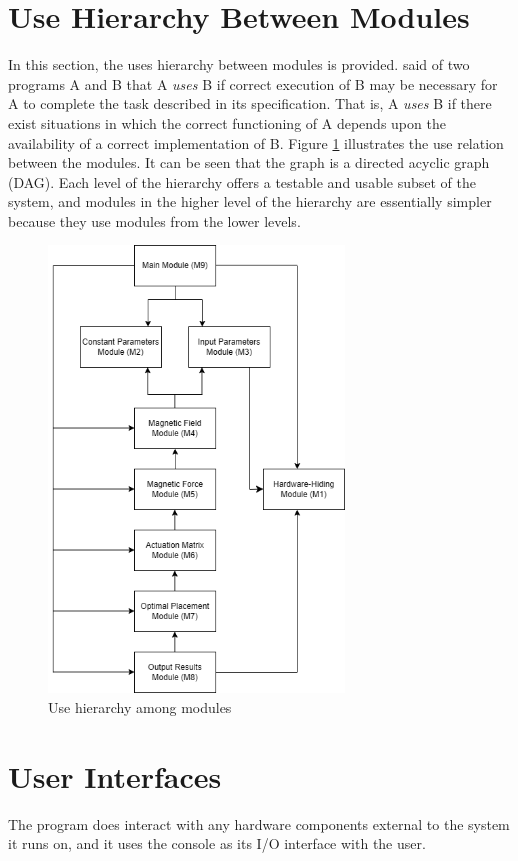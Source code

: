 \documentclass[12pt, titlepage]{article}
\begin{document}
\section{Use Hierarchy Between Modules} \label{SecUse}

In this section, the uses hierarchy between modules is
provided. \citet{Parnas1978} said of two programs A and B that A {\em uses} B if
correct execution of B may be necessary for A to complete the task described in
its specification. That is, A {\em uses} B if there exist situations in which
the correct functioning of A depends upon the availability of a correct
implementation of B.  Figure \ref{FigUH} illustrates the use relation between
the modules. It can be seen that the graph is a directed acyclic graph
(DAG). Each level of the hierarchy offers a testable and usable subset of the
system, and modules in the higher level of the hierarchy are essentially simpler
because they use modules from the lower levels.

\begin{figure}[H]
\centering
\includegraphics[width=0.7\textwidth]{UsesHierarchy.png}
\caption{Use hierarchy among modules}
\label{FigUH}
\end{figure}

\section{User Interfaces}
The program does interact with any hardware components external to the system it runs on, and it uses the console as its I/O interface with the user. 
\end{document}
